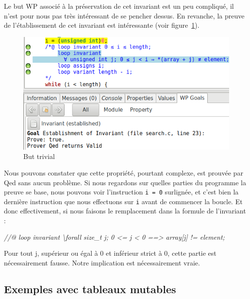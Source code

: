\documentclass[12pt,francais,]{scrbook}
\newenvironment{Shaded}{}{}
\newcommand{\CommentTok}[1]{\textcolor[rgb]{0.38,0.63,0.69}{\textit{{#1}}}}
\begin{document}
Le but WP associé à la préservation de cet invariant est un peu
compliqué, il n'est pour nous pas très intéressant de se pencher dessus.
En revanche, la preuve de l'établissement de cet invariant est
intéressante (voir figure~\ref{fig:3-4-trivial}).

\begin{figure}[htbp]
\centering
\includegraphics[scale=0.5]{3-4-trivial-establishment.png}
\caption{But trivial}
\label{fig:3-4-trivial}
\end{figure}

Nous pouvons constater que cette propriété, pourtant complexe, est
prouvée par Qed sans aucun problème. Si nous regardons sur quelles
parties du programme la preuve se base, nous pouvons voir l'instruction
\texttt{i\ =\ 0} surlignée, et c'est bien la dernière instruction que
nous effectuons sur \texttt{i} avant de commencer la boucle. Et donc
effectivement, si nous faisons le remplacement dans la formule de
l'invariant :

\begin{footnotesize}\begin{Shaded}
\begin{Highlighting}[]
\CommentTok{//@ loop invariant \textbackslash{}forall size_t j; 0 <= j < 0 ==> array[j] != element;}
\end{Highlighting}
\end{Shaded}\end{footnotesize}

\og{}Pour tout j, supérieur ou égal à 0 et inférieur strict à 0\fg{}, cette
partie est nécessairement fausse. Notre implication est nécessairement
vraie.

\subsection{Exemples avec tableaux
mutables}\label{exemples-avec-tableaux-mutables}
\end{document}
